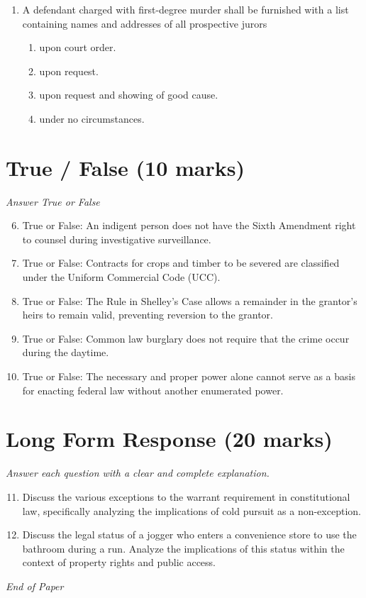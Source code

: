 \documentclass[12pt]{article}
\begin{document}
\begin{enumerate}[label=\arabic*.]
\begin{enumerate}[label=(\alph*)]
    \item Gender
    \item Interstate travel
    \item Privacy
    \item Alienage
\end{enumerate}
\item A defendant charged with first-degree murder shall be furnished with a list containing names and addresses of all prospective jurors
\begin{enumerate}[label=(\alph*)]
    \item upon court order.
    \item upon request.
    \item upon request and showing of good cause.
    \item under no circumstances.
\end{enumerate}
\end{enumerate}

\section*{True / False (10 marks)}
\textit{Answer True or False}
\begin{enumerate}[label=\arabic*.]
\setcounter{enumi}{5}
\item True or False: An indigent person does not have the Sixth Amendment right to counsel during investigative surveillance.
\item True or False: Contracts for crops and timber to be severed are classified under the Uniform Commercial Code (UCC).
\item True or False: The Rule in Shelley's Case allows a remainder in the grantor's heirs to remain valid, preventing reversion to the grantor.
\item True or False: Common law burglary does not require that the crime occur during the daytime.
\item True or False: The necessary and proper power alone cannot serve as a basis for enacting federal law without another enumerated power.
\end{enumerate}

\section*{Long Form Response (20 marks)}
\textit{Answer each question with a clear and complete explanation.}
\begin{enumerate}[label=\arabic*.]
\setcounter{enumi}{10}
\item Discuss the various exceptions to the warrant requirement in constitutional law, specifically analyzing the implications of cold pursuit as a non-exception.
\item Discuss the legal status of a jogger who enters a convenience store to use the bathroom during a run. Analyze the implications of this status within the context of property rights and public access.
\end{enumerate}

\vfill
\noindent\textit{End of Paper}
\end{document}
